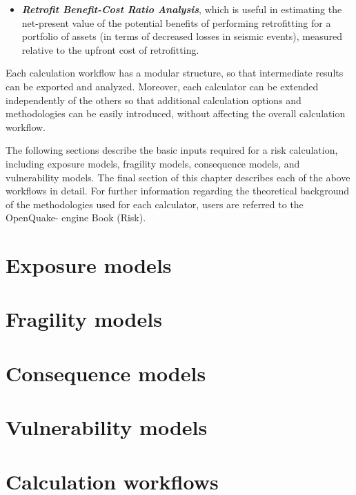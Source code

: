 \begin{itemize}
    \item \textit{\textbf{Retrofit Benefit-Cost Ratio Analysis}}, which is
	useful in estimating the net-present value of the potential benefits of
	performing retrofitting for a portfolio of assets (in terms of decreased
	losses in seismic events), measured relative to the upfront cost of
	retrofitting.

\end{itemize}

Each calculation workflow has a modular structure, so that intermediate
results can be exported and analyzed. Moreover, each calculator can be
extended independently of the others so that additional calculation options
and methodologies can be easily introduced, without affecting the overall
calculation workflow.

The following sections describe the basic inputs required for a risk
calculation, including exposure models, fragility models, consequence models,
and vulnerability models. The final section of this chapter describes each of
the above workflows in detail. For further information regarding the
theoretical background of the methodologies used for each calculator, users
are referred to the OpenQuake- engine Book (Risk).


\section{Exposure models}
\label{sec:exposure}


\section{Fragility models}
\label{sec:fragility}


\section{Consequence models}
\label{sec:consequence}


\section{Vulnerability models}
\label{sec:vulnerability}


\section{Calculation workflows}
\label{sec:risk_workflows}
